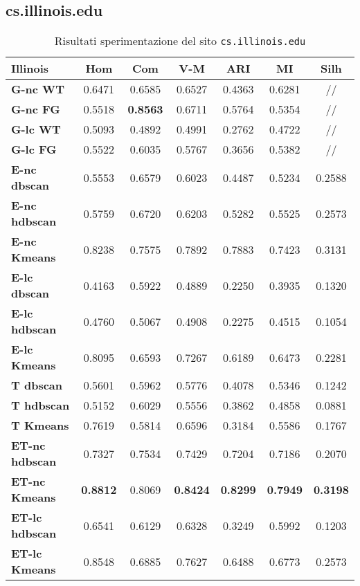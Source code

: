 \subsection{cs.illinois.edu}
\begin{table}[H]
	\begin{tabular}{| l | c | c | c | c | c | c |}
	\hline
	\textbf{Illinois}  & \textbf{Hom} & \textbf{Com} & \textbf{V-M}  & \textbf{ARI}  & \textbf{MI} & \textbf{Silh}\\ [2ex] \hline
	\textbf{G-nc WT} & 0.6471 & 0.6585 & 0.6527 & 0.4363 & 0.6281 & //\\ [2ex]
	 \hline
	\textbf{G-nc FG} & 0.5518 & \textbf{0.8563} & 0.6711 & 0.5764 & 0.5354 & //\\ [2ex]
	 \hline	
	\textbf{G-lc WT} & 0.5093 & 0.4892 & 0.4991 & 0.2762 & 0.4722 & //\\ [2ex]
	 \hline	
	\textbf{G-lc FG} & 0.5522 & 0.6035 & 0.5767 & 0.3656 & 0.5382 & //\\ [2ex]
	\hline
	
	\textbf{E-nc dbscan} & 0.5553 & 0.6579 & 0.6023 & 0.4487 & 0.5234 & 0.2588\\ [2ex]
	 \hline 
	\textbf{E-nc hdbscan} & 0.5759 & 0.6720 & 0.6203 & 0.5282 & 0.5525 & 0.2573\\ [2ex]
	 \hline
	\textbf{E-nc Kmeans} & 0.8238 & 0.7575 & 0.7892 & 0.7883 & 0.7423 & 0.3131\\ [2ex]
	 \hline	
	\textbf{E-lc dbscan} & 0.4163 & 0.5922 & 0.4889 & 0.2250 & 0.3935 & 0.1320\\ [2ex]
	\hline
	\textbf{E-lc hdbscan} & 0.4760 & 0.5067 & 0.4908 & 0.2275 & 0.4515 & 0.1054\\ [2ex]
	\hline
	\textbf{E-lc Kmeans} & 0.8095 & 0.6593 & 0.7267 & 0.6189 & 0.6473 & 0.2281\\ [2ex]
	\hline
	
	\textbf{T dbscan} & 0.5601 & 0.5962 & 0.5776 & 0.4078 & 0.5346 & 0.1242\\ [2ex]
	 \hline 
	\textbf{T hdbscan} & 0.5152 & 0.6029 & 0.5556 & 0.3862 & 0.4858 & 0.0881\\ [2ex]
	 \hline
	\textbf{T Kmeans} & 0.7619 & 0.5814 & 0.6596 & 0.3184 & 0.5586 & 0.1767\\ [2ex]
	 \hline		
	\textbf{ET-nc hdbscan} & 0.7327 & 0.7534 & 0.7429 & 0.7204 & 0.7186 & 0.2070\\ [2ex]
	 \hline 
	\textbf{ET-nc Kmeans} & \textbf{0.8812} & 0.8069 & \textbf{0.8424} & \textbf{0.8299} & \textbf{0.7949} & \textbf{0.3198}\\ [2ex]
	 \hline
	\textbf{ET-lc hdbscan} & 0.6541 & 0.6129 & 0.6328 & 0.3249 & 0.5992 & 0.1203\\ [2ex]
	\hline
	\textbf{ET-lc Kmeans} & 0.8548 & 0.6885 & 0.7627 & 0.6488 & 0.6773 & 0.2573\\ [2ex]
	\hline	
	
	\end{tabular}
	\caption{Risultati sperimentazione del sito \texttt{cs.illinois.edu}}
	\label{metricheIll}
\end{table}

